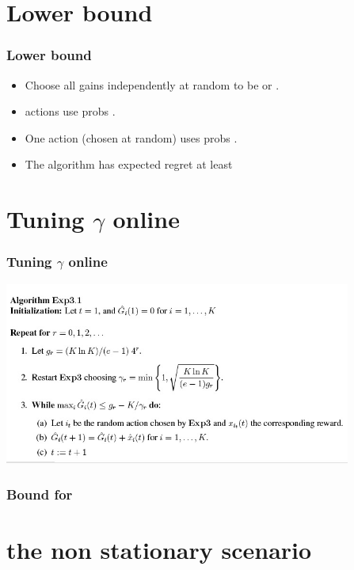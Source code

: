 \documentclass[handout]{beamer}
\begin{document}
\section{Lower bound}

\begin{frame}
\frametitle{Lower bound}
\begin{itemize}
\item Choose all gains independently at random to be  or .
\item {} actions use probs .
\item One action (chosen at random) uses probs .
\item The  algorithm has expected regret at least 
\end{itemize}
\end{frame}

\section{Tuning $\gamma$ online}

\begin{frame}
\frametitle{Tuning $\gamma$ online}
\includegraphics[height=6cm]{figures/Exp3-1.jpg}
\end{frame}

\begin{frame}
\frametitle{Bound for }
\end{frame}
\section{the non stationary scenario}
\end{document}
